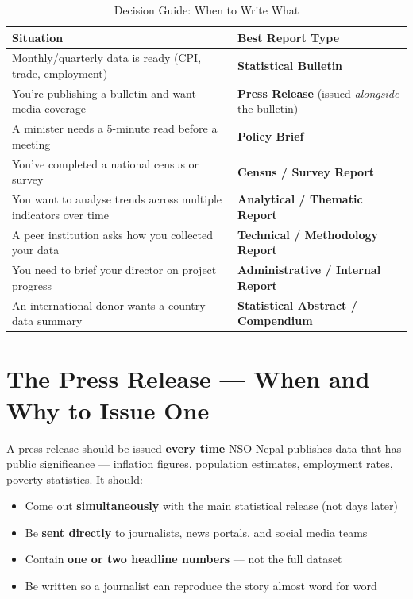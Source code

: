 \documentclass[11pt,a4paper,oneside]{book}
\begin{document}
\begin{table}[htbp]
\centering
\caption{Decision Guide: When to Write What}
\label{tab:decision_guide}
\vspace{0.3cm}
\begin{tabularx}{\textwidth}{X p{6cm}}
\toprule
\textbf{Situation} & \textbf{Best Report Type} \\
\midrule
Monthly/quarterly data is ready (CPI, trade, employment) & \textbf{Statistical Bulletin} \\
\addlinespace
You're publishing a bulletin and want media coverage & \textbf{Press Release} (issued \emph{alongside} the bulletin) \\
\addlinespace
A minister needs a 5-minute read before a meeting & \textbf{Policy Brief} \\
\addlinespace
You've completed a national census or survey & \textbf{Census / Survey Report} \\
\addlinespace
You want to analyse trends across multiple indicators over time & \textbf{Analytical / Thematic Report} \\
\addlinespace
A peer institution asks how you collected your data & \textbf{Technical / Methodology Report} \\
\addlinespace
You need to brief your director on project progress & \textbf{Administrative / Internal Report} \\
\addlinespace
An international donor wants a country data summary & \textbf{Statistical Abstract / Compendium} \\
\bottomrule
\end{tabularx}
\end{table}

\section{The Press Release --- When and Why to Issue One}

A press release should be issued \textbf{every time} NSO Nepal publishes data that has public significance --- inflation figures, population estimates, employment rates, poverty statistics. It should:

\begin{itemize}
    \item Come out \textbf{simultaneously} with the main statistical release (not days later)
    \item Be \textbf{sent directly} to journalists, news portals, and social media teams
    \item Contain \textbf{one or two headline numbers} --- not the full dataset
    \item Be written so a journalist can reproduce the story almost word for word
\end{itemize}
\end{document}
